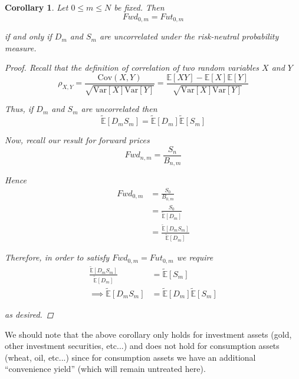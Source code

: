 \documentclass[12pt]{article}
\newtheorem{corollary}{Corollary}
\newlength\tindent
\renewcommand{\indent}{\hspace*{\tindent}}
\newcommand{\E}{\mathbb E}
\newcommand{\var}{\mathrm{Var}}
\newcommand{\cov}{\mathrm{Cov}}
\begin{document}
\begin{corollary} Let $0 \leq m \leq N$ be fixed. Then
\begin{equation*}
	Fwd_{0,m} = Fut_{0,m}
\end{equation*}

if and only if $D_m$ and $S_m$ are uncorrelated under the risk-neutral probability measure.

\begin{proof} Recall that the definition of correlation of two random variables $X$ and $Y$
\begin{equation*}
	\rho_{X,Y} = \frac{ \cov(X,Y) }{\sqrt{\var[X]\var[Y]}} = \frac{ \E[XY] - \E[X]\E[Y] }{\sqrt{\var[X]\var[Y]}}
\end{equation*}

Thus, if $D_m$ and $S_m$ are uncorrelated then
\begin{equation*}
	\tilde{\E}[D_mS_m] = \tilde{\E}[D_m]\tilde{\E}[S_m]
\end{equation*}

Now, recall our result for forward prices
\begin{equation*}
	Fwd_{n,m} = \frac{ S_n }{ B_{n,m} } 
\end{equation*}

Hence
\begin{align*}
	Fwd_{0,m} &= \frac{ S_0 }{ B_{0,m} } \\
	&= \frac{ S_0 }{ \tilde{\E}[D_m] } \\
	&= \frac{ \tilde{\E}[D_mS_m] }{ \tilde{\E}[D_m] }
\end{align*}

Therefore, in order to satisfy $Fwd_{0,m} = Fut_{0,m}$ we require
\begin{align*}
	\frac{ \tilde{\E}[D_mS_m] }{ \tilde{\E}[D_m] } &= \tilde{\E}[S_m] \\
	\implies \tilde{\E}[D_mS_m] &= \tilde{\E}[D_m]\tilde{\E}[S_m]
\end{align*}

as desired.
\end{proof}
\end{corollary}

\indent We should note that the above corollary only holds for investment assets (gold, other investment securities, etc...) and does not hold for consumption assets (wheat, oil, etc...) since for consumption assets we have an additional ``convenience yield'' (which will remain untreated here).
\end{document}
